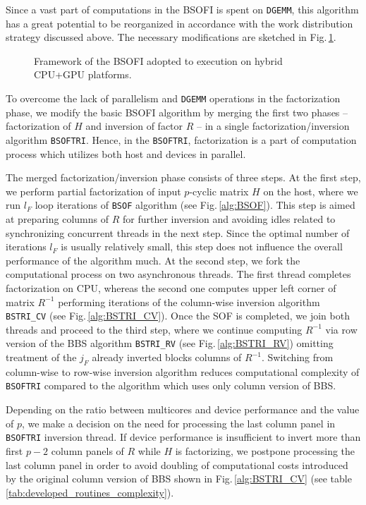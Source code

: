 \documentclass{llncs}
\newcommand{\Bsof}{\texttt{BSOF}\xspace}
\newcommand{\Bsoftri}{\texttt{BSOFTRI}\xspace}
\begin{document}
    Since 
    a vast part of computations in the BSOFI is spent on {\tt DGEMM},
    this algorithm has a great potential to be reorganized 
    in accordance with the work distribution strategy discussed above.
    The necessary modifications are sketched in Fig.\,\ref{fig:BSOFI_HostDevice}. 
    \begin{figure}[t]%
      \scalebox{0.75}{
        
      }
      \caption{Framework of the BSOFI
        adopted to execution on hybrid CPU+GPU platforms.%
        \label{fig:BSOFI_HostDevice}}
    \end{figure}
    To overcome the lack of parallelism and {\tt DGEMM} operations 
    in the factorization phase,
    we modify the basic BSOFI algorithm 
    by merging the first two phases -- 
    factorization of $H$ and inversion of factor $R$ -- 
    in a single factorization/inversion algorithm \Bsoftri. 
    Hence, in the \Bsoftri,
    factorization is a part of computation process which
    utilizes both host and devices in parallel.

    The merged factorization/inversion phase consists of three steps.
    At the first step, 
    we perform partial factorization of input $p$-cyclic matrix $H$ 
    on the host, where we run $l_F$ loop iterations 
    of \Bsof algorithm (see Fig.\,\ref{alg:BSOF}).
    This step is aimed at preparing columns of $R$ for further inversion and 
    avoiding idles related to synchronizing concurrent threads in the next step.
    Since the optimal number of iterations $l_F$ is usually relatively small,
    this step does not influence the overall performance of the algorithm much.
    At the second step, 
    we fork the computational process on two asynchronous threads.
    The first thread completes factorization on CPU,  
    whereas the second one computes upper left corner of matrix $R^{-1}$
    performing iterations of the column-wise inversion 
    algorithm {\tt BSTRI\_CV} (see Fig.\,\ref{alg:BSTRI_CV}).
    Once the SOF is completed, 
    we join both threads and proceed to the third step,
    where we continue computing $R^{-1}$
    via row version of the BBS algorithm {\tt BSTRI\_RV} (see Fig.\,\ref{alg:BSTRI_RV})
    omitting treatment of the $j_F$ already inverted blocks columns of $R^{-1}$.
    Switching from column-wise to row-wise inversion algorithm 
    reduces computational complexity of \Bsoftri 
    compared to the algorithm which uses only column version of BBS.

    Depending on the ratio between multicores and device performance and the value of $p$, 
    we make a decision on the need for processing 
    the last column panel in \Bsoftri inversion thread.
    If device performance is insufficient to invert 
    more than first $p-2$ column panels of $R$
    while $H$ is factorizing, 
    we postpone processing the last column panel 
    in order to avoid doubling of computational costs 
    introduced by the original column version of BBS shown in Fig.\,\ref{alg:BSTRI_CV}
    (see table\,\ref{tab:developed_routines_complexity}).
\end{document}
